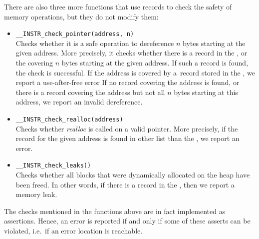 There are also three more functions that use records to check
the safety of memory operations, but they do not modify them:
\begin{itemize}
\item \texttt{\_\_INSTR\_check\_pointer(address, n)}
  \\Checks whether it is a safe operation to dereference $n$ bytes starting at
  the given address. More precisely, it checks whether there is a record in the
  \stacklist, \heaplist or the \globalslist covering $n$ bytes starting at the
  given address.  If such a record is found, the check is successful. If the
  address is covered by a~record stored in the \dealloclist, we report a
  use-after-free error If no record covering the address is found, or there is
  a record covering the address but not all $n$ bytes starting at this address,
  we report an invalid dereference.
\item \texttt{\_\_INSTR\_check\_realloc(address)}
  \\ Checks whether
  \emph{realloc} is called on a valid pointer. More precisely, if the record for
  the given address is found in other list than the \heaplist, we report an
  error.
\item \texttt{\_\_INSTR\_check\_leaks()}
  \\Checks whether all blocks that were dynamically allocated on the heap have been
  freed. In other words, if there is a record in the \heaplist, then we report
  a memory leak.
\end{itemize}

The checks mentioned in the functions above
are in fact implemented as assertions. Hence, an error is reported if
and only if some of these asserts can be violated, i.e.~if an error
location is reachable.

